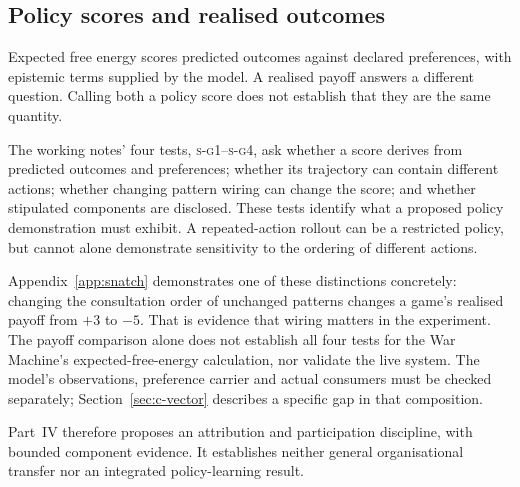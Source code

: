 \subsection*{Policy scores and realised outcomes}

Expected free energy scores predicted outcomes against declared preferences,
with epistemic terms supplied by the model. A realised payoff answers a
different question. Calling both a policy score does not establish that they
are the same quantity.

The working notes' four tests, \textsc{s-g1}--\textsc{s-g4}, ask whether a
score derives from predicted outcomes and preferences; whether its trajectory
can contain different actions; whether changing pattern wiring can change the
score; and whether stipulated components are disclosed. These tests identify
what a proposed policy demonstration must exhibit. A repeated-action rollout
can be a restricted policy, but cannot alone demonstrate sensitivity to the
ordering of different actions.

Appendix~\ref{app:snatch} demonstrates one of these distinctions concretely:
changing the consultation order of unchanged patterns changes a game's realised
payoff from $+3$ to $-5$. That is evidence that wiring matters in the experiment.
The payoff comparison alone does not establish all four tests for the War
Machine's expected-free-energy calculation, nor validate the live system.
The model's observations, preference carrier and actual consumers must be
checked separately; Section~\ref{sec:c-vector} describes a specific gap in that
composition.

Part~IV therefore proposes an attribution and participation discipline, with
bounded component evidence. It establishes neither general organisational
transfer nor an integrated policy-learning result.
